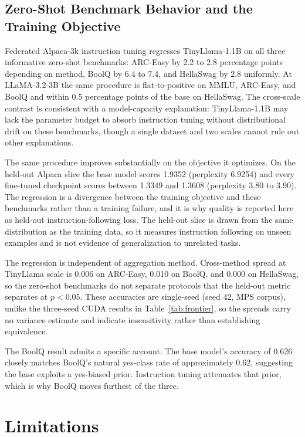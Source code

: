 \documentclass[iicol,pdflatex,sn-mathphys-num]{sn-jnl}
\begin{document}
\subsection{Zero-Shot Benchmark Behavior and the Training Objective}
\label{sec:baseregression}
Federated Alpaca-3k \cite{taori2023alpaca} instruction tuning regresses TinyLlama-1.1B \cite{zhang2024tinyllama} on all three informative zero-shot benchmarks: ARC-Easy by 2.2 to 2.8 percentage points depending on method, BoolQ by 6.4 to 7.4, and HellaSwag by 2.8 uniformly. At LLaMA-3.2-3B \cite{dubey2024llama3} the same procedure is flat-to-positive on MMLU, ARC-Easy, and BoolQ and within 0.5 percentage points of the base on HellaSwag. The cross-scale contrast is consistent with a model-capacity explanation: TinyLlama-1.1B may lack the parameter budget to absorb instruction tuning without distributional drift on these benchmarks, though a single dataset and two scales cannot rule out other explanations.

The same procedure improves substantially on the objective it optimizes. On the held-out Alpaca slice the base model scores 1.9352 (perplexity 6.9254) and every fine-tuned checkpoint scores between 1.3349 and 1.3608 (perplexity 3.80 to 3.90). The regression is a divergence between the training objective and these benchmarks rather than a training failure, and it is why quality is reported here as held-out instruction-following loss. The held-out slice is drawn from the same distribution as the training data, so it measures instruction following on unseen examples and is not evidence of generalization to unrelated tasks.

The regression is independent of aggregation method. Cross-method spread at TinyLlama scale is 0.006 on ARC-Easy, 0.010 on BoolQ, and 0.000 on HellaSwag, so the zero-shot benchmarks do not separate protocols that the held-out metric separates at $p < 0.05$. These accuracies are single-seed (seed 42, MPS corpus), unlike the three-seed CUDA results in Table~\ref{tab:frontier}, so the spreads carry no variance estimate and indicate insensitivity rather than establishing equivalence.

The BoolQ result admits a specific account. The base model's accuracy of 0.626 closely matches BoolQ's natural yes-class rate of approximately 0.62, suggesting the base exploits a yes-biased prior. Instruction tuning attenuates that prior, which is why BoolQ moves furthest of the three.

\section{Limitations}
\label{sec:limitations}
\end{document}
